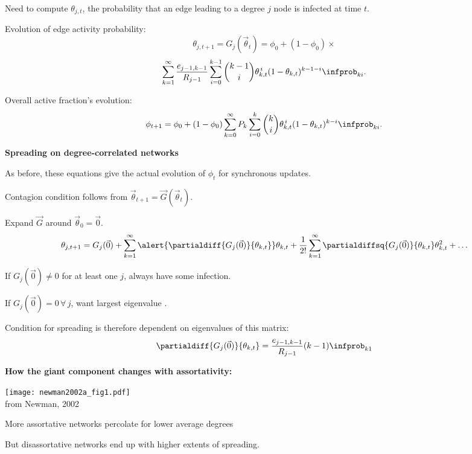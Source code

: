     Need to compute $\theta_{j,t}$, the probability that 
    an edge leading to a degree $j$ node is infected at time $t$.
  
    Evolution of edge activity probability:
    $$
    \theta_{j,t+1}
    =
    G_j(\vec{\theta}_t)
    =
    \phi_0 + 
    (1-\phi_0) \times
    $$
    $$
    \sum_{k=1}^{\infty}
    \frac{e_{j-1,k-1}}{R_{j-1}}
    \sum_{i=0}^{k-1}
    \binom{k-1}{i}
    \theta_{k,t}^{\, i}
    (1-\theta_{k,t})^{k-1-i}
    \infprob_{ki}.
    $$
   
    Overall active fraction's evolution:
    $$
    \phi_{t+1}
    =
    \phi_0
    +
    (1-\phi_0)
    \sum_{k=0}^{\infty}
    P_k
    \sum_{i=0}^{k}
    \binom{k}{i}
    \theta_{k,t}^{\, i}
    (1-\theta_{k,t})^{k-i}
    \infprob_{ki}.
    $$
  


  \textbf{Spreading on degree-correlated networks}

  
  
    As before, these equations give the actual evolution
    of $\phi_t$ for synchronous updates.
  
    Contagion condition follows from $\vec{\theta}_{t+1} = \vec{G}(\vec{\theta}_{t})$.
  
    Expand $\vec{G}$ around $\vec{\theta}_{0}=\vec{0}$.
    {
      $$
      \theta_{j,t+1} =
      G_j(\vec{0})
      + 
      \sum_{k=1}^\infty
      \alert{\partialdiff{G_j(\vec{0})}{\theta_{k,t}}}
      \theta_{k,t}
      +
      \frac{1}{2!}
      \sum_{k=1}^\infty
      \partialdiffsq{G_j(\vec{0})}{\theta_{k,t}}
      \theta_{k,t}^2
      +
      \ldots
      $$
    }
  
    If $G_j(\vec{0}) \ne 0$ for at least one $j$, always have some infection.
  
    If $G_j(\vec{0}) = 0 \, \forall \, j$, want largest eigenvalue
    .
   
    Condition for spreading is therefore
    dependent on eigenvalues of this matrix:
    $$
    \partialdiff{G_j(\vec{0})}{\theta_{k,t}} 
    = 
    \frac{e_{j-1,k-1}}{R_{j-1}}
    (k-1)
    \infprob_{k1}
    $$



  \textbf{How the giant component changes with assortativity:}

      
    \texttt{[image: newman2002a\_fig1.pdf]}\\
    {\tiny from Newman, 2002\cite{newman2002a}}
    
    
     
      More assortative networks percolate for
      lower average degrees
     
      But disassortative networks end up with
      higher extents of spreading.
    
  